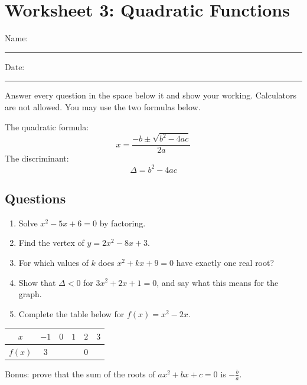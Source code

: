 \documentclass{article}
\newcommand{\answerspace}{\vspace{3cm}}
\begin{document}
\section*{Worksheet 3: Quadratic Functions}

Name: \rule{6cm}{0.4pt} \hfill Date: \rule{3cm}{0.4pt}

\medskip

Answer every question in the space below it and show your working. Calculators are not allowed. You may use the two formulas below.

The quadratic formula:
\[
x = \frac{-b \pm \sqrt{b^2 - 4ac}}{2a}
\]
The discriminant:
\[
\Delta = b^2 - 4ac
\]
\subsection*{Questions}

\begin{enumerate}
  \item Solve $x^2 - 5x + 6 = 0$ by factoring.
  \answerspace
  \item Find the vertex of $y = 2x^2 - 8x + 3$.
  \answerspace
  \item For which values of $k$ does $x^2 + kx + 9 = 0$ have exactly one real root?
  \answerspace
  \item Show that $\Delta < 0$ for $3x^2 + 2x + 1 = 0$, and say what this means for the graph.
  \answerspace
  \item Complete the table below for $f(x) = x^2 - 2x$.
\end{enumerate}

\begin{center}
\begin{tabular}{|c|c|c|c|c|c|}
\hline
$x$ & $-1$ & $0$ & $1$ & $2$ & $3$ \\
\hline
$f(x)$ & $3$ &  &  & $0$ &  \\
\hline
\end{tabular}
\end{center}

\bigskip

Bonus: prove that the sum of the roots of $ax^2 + bx + c = 0$ is $-\frac{b}{a}$.
\end{document}
